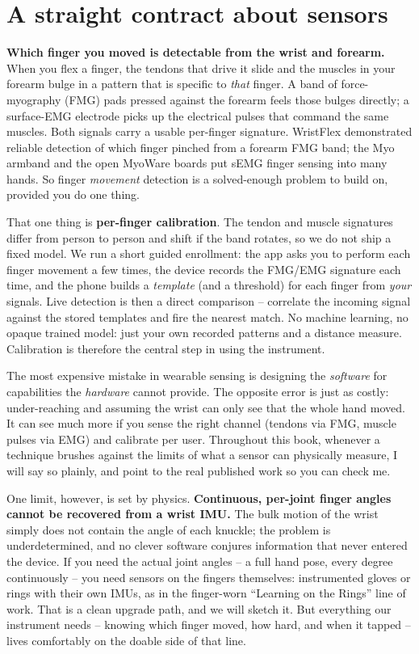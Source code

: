 \section*{A straight contract about sensors}

\textbf{Which finger you moved is detectable from the wrist and forearm.} When you flex a
finger, the tendons that drive it slide and the muscles in your forearm bulge in a pattern
that is specific to \emph{that} finger. A band of force-myography (FMG) pads pressed against
the forearm feels those bulges directly; a surface-EMG electrode picks up the electrical
pulses that command the same muscles. Both signals carry a usable per-finger signature.
WristFlex demonstrated reliable detection of which finger pinched from a forearm FMG band;
the Myo armband and the open MyoWare boards put sEMG finger sensing into many hands. So
finger \emph{movement} detection is a solved-enough problem to build
on, provided you do one thing.

That one thing is \textbf{per-finger calibration}. The tendon and muscle signatures differ
from person to person and shift if the band rotates, so we do not ship a fixed model. We run
a short guided enrollment: the app asks you to perform each finger movement a few times, the
device records the FMG/EMG signature each time, and the phone builds a \emph{template} (and
a threshold) for each finger from \emph{your} signals. Live detection is then a direct
comparison -- correlate the incoming signal against the stored templates and fire the
nearest match. No machine learning, no opaque trained model: just your own recorded patterns
and a distance measure. Calibration is therefore the central step in using the instrument.

\begin{trapbox}
The most expensive mistake in wearable sensing is designing the \emph{software} for
capabilities the \emph{hardware} cannot provide. The opposite error is just as costly:
under-reaching and assuming the wrist can only see that the whole hand moved. It can see much more
if you sense the right channel (tendons via FMG, muscle pulses via EMG) and
calibrate per user. Throughout this book, whenever a technique brushes against the limits of
what a sensor can physically measure, I will say so plainly, and point to the real published
work so you can check me.
\end{trapbox}

One limit, however, is set by physics.
\textbf{Continuous, per-joint finger angles cannot be recovered from a wrist IMU.} The bulk
motion of the wrist simply does not contain the angle of each knuckle; the problem is
underdetermined, and no clever software conjures information that never entered the device.
If you need the actual joint angles -- a full hand pose, every degree continuously -- you
need sensors on the fingers themselves: instrumented gloves or rings with their own IMUs, as
in the finger-worn ``Learning on the Rings'' line of work. That is a clean upgrade path, and
we will sketch it. But everything our instrument needs -- knowing which finger moved, how
hard, and when it tapped -- lives comfortably on the doable side of that line.

